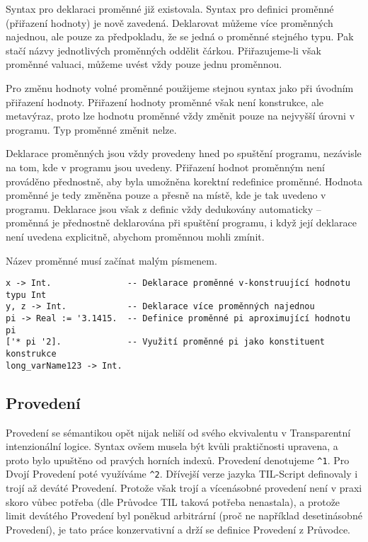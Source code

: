 Syntax pro deklaraci proměnné již existovala. Syntax pro definici proměnné (přiřazení hodnoty)
je nově zavedená. Deklarovat můžeme více proměnných najednou, ale pouze za předpokladu, že se jedná
o proměnné stejného typu. Pak stačí názvy jednotlivých proměnných oddělit čárkou. Přiřazujeme-li
však proměnné valuaci, můžeme uvést vždy pouze jednu proměnnou.

Pro změnu hodnoty volné proměnné použijeme stejnou syntax jako při úvodním přiřazení hodnoty.
Přiřazení hodnoty proměnné však není konstrukce, ale metavýraz, proto lze hodnotu proměnné vždy
změnit pouze na nejvyšší úrovni v programu. Typ proměnné změnit nelze.

Deklarace proměnných jsou vždy provedeny hned po spuštění programu, nezávisle na tom, kde v programu
jsou uvedeny. Přiřazení hodnot proměnným není prováděno přednostně, aby byla umožněna korektní
redefinice proměnné. Hodnota proměnné je tedy změněna pouze a přesně na místě, kde je tak uvedeno
v programu. Deklarace jsou však z definic vždy dedukovány automaticky -- proměnná je přednostně
deklarována při spuštění programu, i když její deklarace není uvedena explicitně, abychom proměnnou
mohli zmínit.

Název proměnné musí začínat malým písmenem. 

\begin{lstlisting}[caption={Příklad využití proměnných}]
x -> Int.               -- Deklarace proměnné v-konstruující hodnotu typu Int
y, z -> Int.            -- Deklarace více proměnných najednou
pi -> Real := '3.1415.  -- Definice proměnné pi aproximující hodnotu pi
['* pi '2].             -- Využití proměnné pi jako konstituent konstrukce
long_varName123 -> Int.
\end{lstlisting}

\subsection{Provedení}

Provedení se sémantikou opět nijak neliší od svého ekvivalentu v Transparentní intenzionální
logice. Syntax ovšem musela být kvůli praktičnosti upravena, a proto bylo upuštěno od pravých
horních indexů. Provedení denotujeme \lstinline{^1}. Pro Dvojí Provedení poté využíváme
\lstinline{^2}. Dřívejší verze jazyka TIL-Script definovaly i trojí až deváté Provedení. Protože
však trojí a vícenásobné provedení není v praxi skoro vůbec potřeba (dle Průvodce TIL taková potřeba
nenastala), a protože limit devátého Provedení byl poněkud arbitrární (proč ne například
desetinásobné Provedení), je tato práce konzervativní a drží se definice Provedení z Průvodce.

